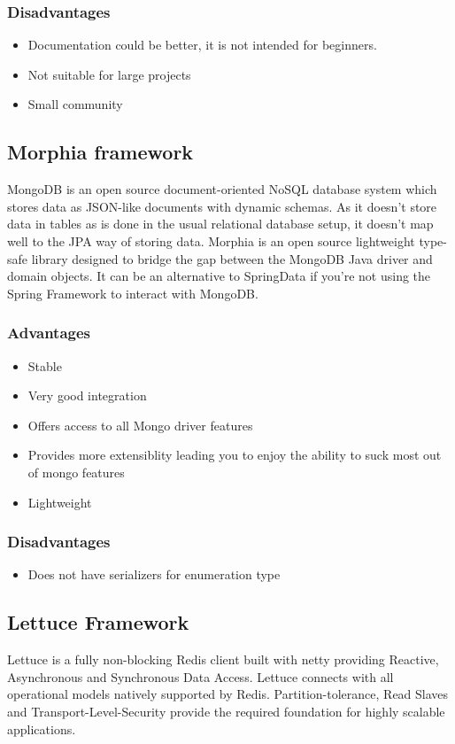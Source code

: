 \documentclass[a4paper, hidelinks, 12pt]{report}
\begin{document}
\subsubsection{Disadvantages}
			\begin{itemize}
		\item{} Documentation could be better, it is not intended for beginners.
		\item{} Not suitable for large projects
		\item{} Small community
		\end{itemize}

\subsection{Morphia framework}
MongoDB is an open source document-oriented NoSQL database system which stores data as JSON-like documents with dynamic schemas.  As it doesn't store data in tables as is done in the usual relational database setup, it doesn't map well to the JPA way of storing data. Morphia is an open source lightweight type-safe library designed to bridge the gap between the MongoDB Java driver and domain objects. It can be an alternative to SpringData if you're not using the Spring Framework to interact with MongoDB.

\subsubsection{Advantages}

		\begin{itemize}
		\item{} Stable
	\item{} Very good integration
	\item{} Offers access to all Mongo driver features
	\item{} Provides more extensiblity leading you to enjoy the ability to suck most out of mongo features
	\item{} Lightweight
		\end{itemize}
\subsubsection{Disadvantages}
			\begin{itemize}
		\item{} Does not have serializers for enumeration type
		\end{itemize}

\subsection{Lettuce Framework}
 Lettuce is a fully non-blocking Redis client built with netty providing Reactive, Asynchronous and Synchronous Data Access. Lettuce connects with all operational models natively supported by Redis. Partition-tolerance, Read Slaves and Transport-Level-Security provide the required foundation for highly scalable applications.
\end{document}
